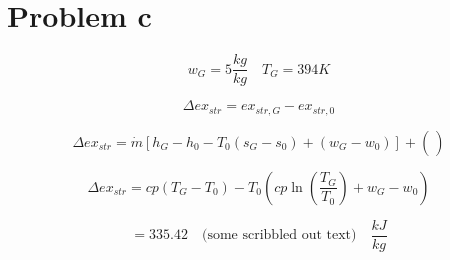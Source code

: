 \section*{Problem c}

\[
w_G = 5 \frac{kg}{kg} \quad T_G = 394K
\]


\[
\Delta ex_{str} = ex_{str,G} - ex_{str,0}
\]

\[
\Delta ex_{str} = \dot{m} \left[ h_G - h_0 - T_0 (s_G - s_0) + (w_G - w_0) \right] + \left( \frac{}{} \right)
\]

\[
\Delta ex_{str} = cp (T_G - T_0) - T_0 \left( cp \ln \left( \frac{T_G}{T_0} \right) + w_G - w_0 \right)
\]

\[
= 335.42 \quad \text{(some scribbled out text)} \quad \frac{kJ}{kg}
\]